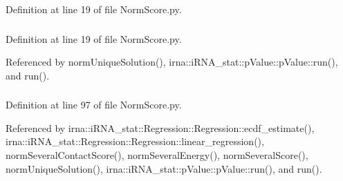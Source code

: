 \-Definition at line 19 of file \-Norm\-Score.\-py.

\hypertarget{classirna_1_1iRNA__stat_1_1NormScore_1_1NormScore_a1c61805c5e00cd686a9a20f646326d7c}{
\subsubsection[{interactions}]{}}
\label{classirna_1_1iRNA__stat_1_1NormScore_1_1NormScore_a1c61805c5e00cd686a9a20f646326d7c}


\-Definition at line 19 of file \-Norm\-Score.\-py.



\-Referenced by norm\-Unique\-Solution(), irna\-::i\-R\-N\-A\-\_\-stat\-::p\-Value\-::p\-Value\-::run(), and run().

\hypertarget{classirna_1_1iRNA__stat_1_1NormScore_1_1NormScore_a2e2907cbb46d433d7c3e0b1189360484}{
\subsubsection[{norm\-\_\-score}]{}}
\label{classirna_1_1iRNA__stat_1_1NormScore_1_1NormScore_a2e2907cbb46d433d7c3e0b1189360484}


\-Definition at line 97 of file \-Norm\-Score.\-py.



\-Referenced by irna\-::i\-R\-N\-A\-\_\-stat\-::\-Regression\-::\-Regression\-::ecdf\-\_\-estimate(), irna\-::i\-R\-N\-A\-\_\-stat\-::\-Regression\-::\-Regression\-::linear\-\_\-regression(), norm\-Several\-Contact\-Score(), norm\-Several\-Energy(), norm\-Several\-Score(), norm\-Unique\-Solution(), irna\-::i\-R\-N\-A\-\_\-stat\-::p\-Value\-::p\-Value\-::run(), and run().

